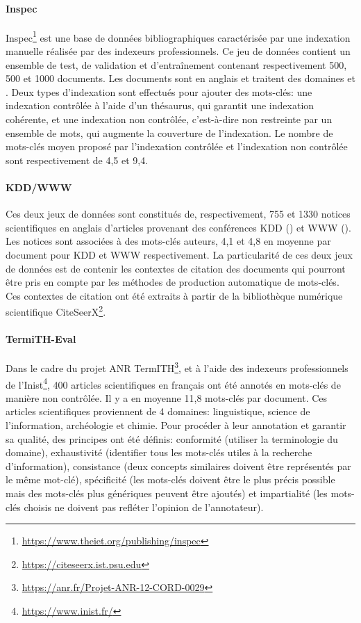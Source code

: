 \paragraph{Inspec~\cite{hulth_improved_2003}}
Inspec\footnote{\url{https://www.theiet.org/publishing/inspec}} est une base de données bibliographiques caractérisée par une indexation manuelle réalisée par des indexeurs professionnels.
Ce jeu de données contient un ensemble de test, de validation et d'entraînement contenant respectivement 500, 500 et \num{1000} documents. Les documents sont en anglais et traitent des domaines  et .
Deux types d'indexation sont effectués pour ajouter des mots-clés: une indexation contrôlée à l'aide d'un thésaurus, qui garantit une indexation cohérente, et une indexation non contrôlée, c'est-à-dire non restreinte par un ensemble de mots, qui augmente la couverture de l'indexation.
Le nombre de mots-clés moyen proposé par l'indexation contrôlée et l'indexation non contrôlée sont respectivement de 4,5 et 9,4.


\paragraph{KDD/WWW~\cite{caragea_citation-enhanced_2014}}
Ces deux jeux de données sont constitués de, respectivement, 755 et \num{1330} notices scientifiques en anglais d'articles provenant des conférences KDD () et WWW ().
Les notices sont associées à des mots-clés auteurs, 4,1 et 4,8 en moyenne par document pour KDD et WWW respectivement.
La particularité de ces deux jeux de données est de contenir les contextes de citation des documents qui pourront être pris en compte par les méthodes de production automatique de mots-clés.
Ces contextes de citation ont été extraits à partir de la bibliothèque numérique scientifique CiteSeerX\footnote{\url{https://citeseerx.ist.psu.edu}}.


\paragraph{TermiTH-Eval~\cite{bougouin_termith-eval:_2016}}
Dans le cadre du projet ANR TermITH\footnote{\url{https://anr.fr/Projet-ANR-12-CORD-0029}}, et à l'aide des indexeurs professionnels de l'Inist\footnote{\url{https://www.inist.fr/}}, 400 articles scientifiques en français ont été annotés en mots-clés de manière non contrôlée. Il y a en moyenne 11,8 mots-clés par document.
Ces articles scientifiques proviennent de 4 domaines: linguistique, science de l'information, archéologie et chimie.
Pour procéder à leur annotation et garantir sa qualité, des principes ont été définis: conformité (utiliser la terminologie du domaine), exhaustivité (identifier tous les mots-clés utiles à la recherche d'information), consistance (deux concepts similaires doivent être représentés par le même mot-clé), spécificité (les mots-clés doivent être le plus précis possible mais des mots-clés plus génériques peuvent être ajoutés) et impartialité (les mots-clés choisis ne doivent pas refléter l'opinion de l'annotateur).

